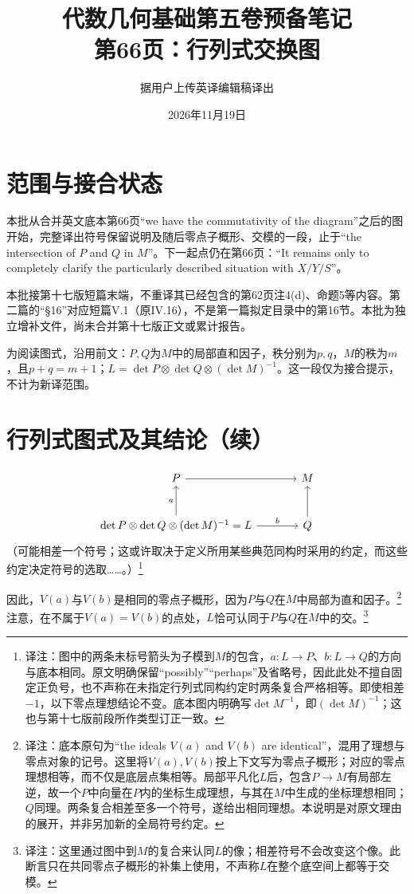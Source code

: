 \documentclass[openany,fontset=fandol]{ctexbook}
\newcommand{\note}[1]{\unskip\nobreak\footnote{译注：#1}}
\begin{document}
\title{代数几何基础第五卷预备笔记\\第66页：行列式交换图}
\author{据用户上传英译编辑稿译出}
\date{2026年11月19日}
\maketitle
\chapter*{范围与接合状态}
本批从合并英文底本第66页“we have the commutativity of the diagram”之后的图开始，完整译出符号保留说明及随后零点子概形、交模的一段，止于“the intersection of $P$ and $Q$ in $M$”。下一起点仍在第66页：“It remains only to completely clarify the particularly described situation with $X/Y/S$”。

本批接第十七版短篇末端，不重译其已经包含的第62页注4(d)、命题5等内容。第二篇的“§16”对应短篇V.1（原IV.16），不是第一篇拟定目录中的第16节。本批为独立增补文件，尚未合并第十七版正文或累计报告。

为阅读图式，沿用前文：$P,Q$为$M$中的局部直和因子，秩分别为$p,q$，$M$的秩为$m$，且$p+q=m+1$；$L=\det P\otimes\det Q\otimes(\det M)^{-1}$。这一段仅为接合提示，不计为新译范围。
\chapter*{行列式图式及其结论（续）}
\[
\begin{tikzcd}[row sep=large,column sep=large]
P \arrow[r] & M \\
\det P\otimes\det Q\otimes(\det M)^{-1}=L
\arrow[u,"a"] \arrow[r,"b"] & Q \arrow[u]
\end{tikzcd}
\]
（可能相差一个符号；这或许取决于定义所用某些典范同构时采用的约定，而这些约定决定符号的选取……。）\note{图中的两条未标号箭头为子模到$M$的包含，$a:L\to P$、$b:L\to Q$的方向与底本相同。原文明确保留“possibly”“perhaps”及省略号，因此此处不擅自固定正负号，也不声称在未指定行列式同构约定时两条复合严格相等。即使相差$-1$，以下零点理想结论不变。底本图内明确写$\det M^{-1}$，即$(\det M)^{-1}$；这也与第十七版前段所作类型订正一致。}

因此，$V(a)$与$V(b)$是相同的零点子概形，因为$P$与$Q$在$M$中局部为直和因子。\note{底本原句为“the ideals $V(a)$ and $V(b)$ are identical”，混用了理想与零点对象的记号。这里将$V(a),V(b)$按上下文写为零点子概形；对应的零点理想相等，而不仅是底层点集相等。局部平凡化$L$后，包含$P\to M$有局部左逆，故一个$P$中向量在$P$内的坐标生成理想，与其在$M$中生成的坐标理想相同；$Q$同理。两条复合相差至多一个符号，遂给出相同理想。本说明是对原文理由的展开，并非另加新的全局符号约定。}
注意，在不属于$V(a)=V(b)$的点处，$L$恰可认同于$P$与$Q$在$M$中的交。\note{这里通过图中到$M$的复合来认同$L$的像；相差符号不会改变这个像。此断言只在共同零点子概形的补集上使用，不声称$L$在整个底空间上都等于交模。}
\end{document}
